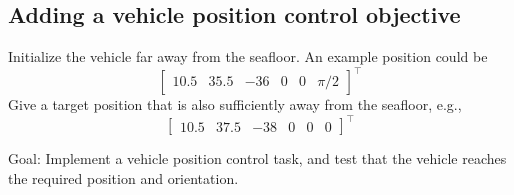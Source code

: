 \documentclass{article}
\begin{document}
\subsection{Adding a vehicle position control objective}
Initialize the vehicle far away from the seafloor. An example position could be
\begin{displaymath}
\begin{bmatrix} 10.5 & 35.5 & -36 & 0 & 0 & \pi/2\end{bmatrix}^\top
\end{displaymath} 
Give a target position that is also sufficiently away from the seafloor, e.g.,
\begin{displaymath}
\begin{bmatrix} 10.5 & 37.5 & -38 & 0 & 0 & 0 \end{bmatrix}^\top
\end{displaymath}

Goal: Implement a vehicle position control task, and test that the vehicle reaches the required position and orientation.
\end{document}

